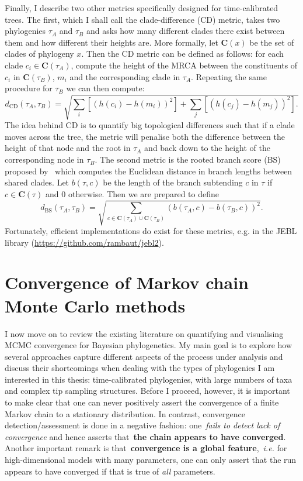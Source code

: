 Finally, I describe two other metrics specifically designed for time-calibrated trees.
The first, which I shall call the clade-difference (CD) metric, takes two phylogenies $\tau_A$ and $\tau_B$ and asks how many different clades there exist between them and how different their heights are.
More formally, let $\boldsymbol C(x)$ be the set of clades of phylogeny $x$.
Then the CD metric can be defined as follows: for each clade $c_i \in \boldsymbol C(\tau_A)$, compute the height of the MRCA between the constituents of $c_i$ in $\boldsymbol C(\tau_B)$, $m_i$ and the corresponding clade in $\tau_A$.
Repeating the same procedure for $\tau_B$ we can then compute:
$$ d_{\text{CD}} (\tau_A, \tau_B) = \sqrt{  \sum_i\left[ \left(h(c_i) - h(m_i) \right)^2 \right]  + \sum_j \left[ \left(h(c_j) - h(m_j)\right)^2 \right].  } $$
The idea behind CD is to quantify big topological differences such that  if a clade moves  across the tree, the metric will penalise both the difference between the height of that node and the root in $\tau_A$ and back down to the height of the corresponding node in $\tau_B$.
The second metric is the rooted branch score (BS) proposed by~\cite{Heled2010} which computes the Euclidean distance in branch lengths between shared clades.
Let $b(\tau, c)$ be the length of the branch subtending $c$ in $\tau$ if $c \in \boldsymbol C(\tau)$ and $0$ otherwise.
Then we are prepared to define
$$d_{\text{BS}}(\tau_A, \tau_B) = \sqrt{ \sum_{c \in \boldsymbol C(\tau_A) \cup \boldsymbol C(\tau_B) } \left( b(\tau_A, c) - b(\tau_B, c) \right)^2 }  .$$
Fortunately, efficient implementations do exist for these metrics, e.g. in the JEBL library (\url{https://github.com/rambaut/jebl2}).

\section{Convergence of Markov chain Monte Carlo methods} %
\label{sec:litrev}

I now move on to review the existing literature on quantifying and visualising MCMC convergence for Bayesian phylogenetics.
My main goal is to explore how several approaches capture different aspects of the process under analysis and discuss their shortcomings when dealing with the types of phylogenies I am interested in this thesis: time-calibrated phylogenies, with large numbers of taxa and complex tip sampling structures.
Before I proceed, however, it is important to make clear that one can never positively assert the convergence of a finite Markov chain to a stationary distribution.
In contrast, convergence detection/assessment is done in a negative fashion: one~\textit{fails to detect lack of convergence} and hence asserts that~\textbf{the chain appears to have converged}.
Another important remark is that~\textbf{convergence is a global feature},~\textit{i.e.} for high-dimensional models with many parameters, one can only assert that the run appears to have converged if that is true of \textit{all} parameters.

